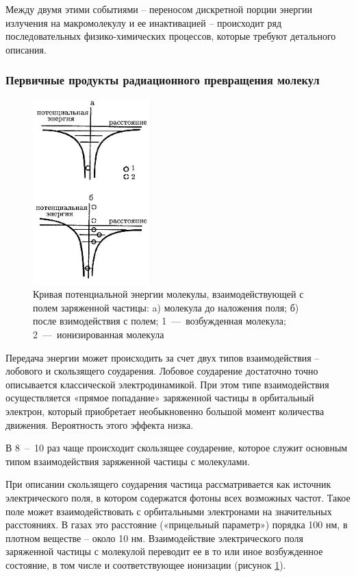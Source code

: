\documentclass[a4paper, 14pt]{article}
\begin{document}
Между двумя этими событиями – переносом дискретной порции энергии излучения на макромолекулу и ее инактивацией – происходит ряд последовательных физико-химических процессов, которые требуют детального описания.

\subsubsection{Первичные продукты радиационного превращения молекул}
\begin{figure}
    \begin{center}
      \includegraphics[width=0.4\textwidth]{potentialEnergy.png}
    \end{center}
    \caption{Кривая потенциальной энергии молекулы, взаимодействующей с полем заряженной частицы: a) молекула до наложения поля; б) после взимодействия с полем; 1~---~возбужденная молекула; 2~---~ионизированная молекула}
    \label{potentialEnergy}
\end{figure}
Передача энергии может происходить за счет двух типов взаимодействия –
лобового и скользящего соударения. Лобовое соударение достаточно точно
описывается классической электродинамикой. При этом типе взаимодействия
осуществляется «прямое попадание» заряженной частицы в орбитальный электрон,
который приобретает необыкновенно большой момент количества движения.
Вероятность этого эффекта низка.

В 8~--~10 раз чаще происходит скользящее соударение, которое служит основным типом взаимодействия заряженной частицы с молекулами.

При описании скользящего соударения частица рассматривается как источник электрического поля, в котором содержатся фотоны всех возможных частот. Такое поле может взаимодействовать с орбитальными электронами на значительных расстояниях. В газах это расстояние («прицельный параметр») порядка 100 нм, в плотном веществе – около 10 нм. Взаимодействие электрического поля заряженной частицы с молекулой переводит ее в то или иное возбужденное состояние, в том числе и соответствующее ионизации (рисунок \ref{potentialEnergy}). 
\end{document}
